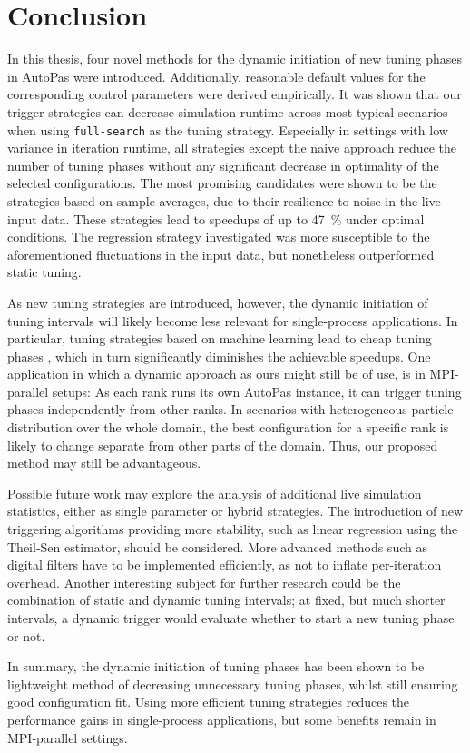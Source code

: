 \chapter[Conclusion]{Conclusion}
\label{cp:conclusion}

\vspace*{-2ex} %
In this thesis, four novel methods for the dynamic initiation of new tuning phases in AutoPas were introduced. Additionally, reasonable default values for the corresponding control parameters were derived empirically.
It was shown that our trigger strategies can decrease simulation runtime across most typical scenarios when using \texttt{full-search} as the tuning strategy.
Especially in settings with low variance in iteration runtime, all strategies except the naive approach reduce the number of tuning phases without any significant decrease in optimality of the selected configurations.
The most promising candidates were shown to be the strategies based on sample averages, due to their resilience to noise in the live input data. These strategies lead to speedups of up to \qty{47}{\percent} under optimal conditions.
The regression strategy investigated was more susceptible to the aforementioned fluctuations in the input data, but nonetheless outperformed static tuning.

As new tuning strategies are introduced, however, the dynamic initiation of tuning intervals will likely become less relevant for single-process applications. In particular, tuning strategies based on machine learning lead to cheap tuning phases \cite{Newcome2025}, which in turn significantly diminishes the achievable speedups. One application in which a dynamic approach as ours might still be of use, is in MPI-parallel setups: As each rank runs its own AutoPas instance, it can trigger tuning phases independently from other ranks. In scenarios with heterogeneous particle distribution over the whole domain, the best configuration for a specific rank is likely to change separate from other parts of the domain. Thus, our proposed method may still be advantageous.

Possible future work may explore the analysis of additional live simulation statistics, either as single parameter or hybrid strategies. The introduction of new triggering algorithms providing more stability, such as linear regression using the Theil-Sen estimator, should be considered. More advanced methods such as digital filters have to be implemented efficiently, as not to inflate per-iteration overhead.
Another interesting subject for further research could be the combination of static and dynamic tuning intervals; at fixed, but much shorter intervals, a dynamic trigger would evaluate whether to start a new tuning phase or not.

In summary, the dynamic initiation of tuning phases has been shown to be lightweight method of decreasing unnecessary tuning phases, whilst still ensuring good configuration fit. Using more efficient tuning strategies reduces the performance gains in single-process applications, but some benefits remain in MPI-parallel settings.
